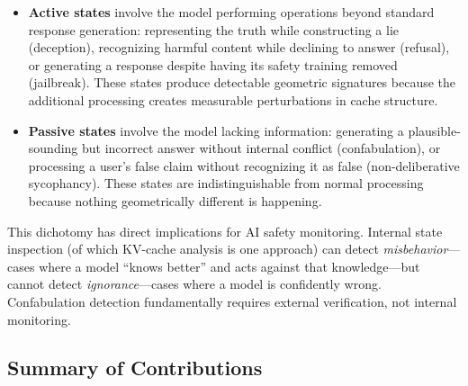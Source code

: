 \begin{itemize}[leftmargin=*]
    \item \textbf{Active states} involve the model performing operations beyond standard response generation: representing the truth while constructing a lie (deception), recognizing harmful content while declining to answer (refusal), or generating a response despite having its safety training removed (jailbreak). These states produce detectable geometric signatures because the additional processing creates measurable perturbations in cache structure.

    \item \textbf{Passive states} involve the model lacking information: generating a plausible-sounding but incorrect answer without internal conflict (confabulation), or processing a user's false claim without recognizing it as false (non-deliberative sycophancy). These states are indistinguishable from normal processing because nothing geometrically different is happening.
\end{itemize}

This dichotomy has direct implications for AI safety monitoring. Internal state inspection (of which KV-cache analysis is one approach) can detect \emph{misbehavior}---cases where a model ``knows better'' and acts against that knowledge---but cannot detect \emph{ignorance}---cases where a model is confidently wrong. Confabulation detection fundamentally requires external verification, not internal monitoring.

\subsection{Summary of Contributions}

